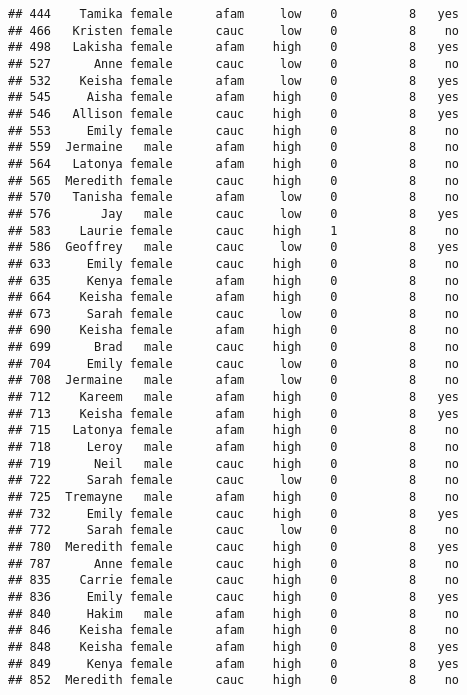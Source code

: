 \documentclass[
]{article}
\begin{document}
\begin{verbatim}
## 444    Tamika female      afam     low    0          8   yes
## 466   Kristen female      cauc     low    0          8    no
## 498   Lakisha female      afam    high    0          8   yes
## 527      Anne female      cauc     low    0          8    no
## 532    Keisha female      afam     low    0          8   yes
## 545     Aisha female      afam    high    0          8   yes
## 546   Allison female      cauc    high    0          8   yes
## 553     Emily female      cauc    high    0          8    no
## 559  Jermaine   male      afam    high    0          8    no
## 564   Latonya female      afam    high    0          8    no
## 565  Meredith female      cauc    high    0          8    no
## 570   Tanisha female      afam     low    0          8    no
## 576       Jay   male      cauc     low    0          8   yes
## 583    Laurie female      cauc    high    1          8    no
## 586  Geoffrey   male      cauc     low    0          8   yes
## 633     Emily female      cauc    high    0          8    no
## 635     Kenya female      afam    high    0          8    no
## 664    Keisha female      afam    high    0          8    no
## 673     Sarah female      cauc     low    0          8    no
## 690    Keisha female      afam    high    0          8    no
## 699      Brad   male      cauc    high    0          8    no
## 704     Emily female      cauc     low    0          8    no
## 708  Jermaine   male      afam     low    0          8    no
## 712    Kareem   male      afam    high    0          8   yes
## 713    Keisha female      afam    high    0          8   yes
## 715   Latonya female      afam    high    0          8    no
## 718     Leroy   male      afam    high    0          8    no
## 719      Neil   male      cauc    high    0          8    no
## 722     Sarah female      cauc     low    0          8    no
## 725  Tremayne   male      afam    high    0          8    no
## 732     Emily female      cauc    high    0          8   yes
## 772     Sarah female      cauc     low    0          8    no
## 780  Meredith female      cauc    high    0          8   yes
## 787      Anne female      cauc    high    0          8    no
## 835    Carrie female      cauc    high    0          8    no
## 836     Emily female      cauc    high    0          8   yes
## 840     Hakim   male      afam    high    0          8    no
## 846    Keisha female      afam    high    0          8    no
## 848    Keisha female      afam    high    0          8   yes
## 849     Kenya female      afam    high    0          8   yes
## 852  Meredith female      cauc    high    0          8    no

\end{verbatim}
\end{document}
